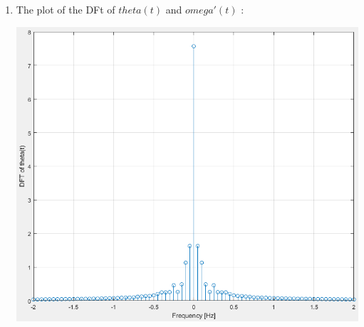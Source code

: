 \documentclass[a4paper,12pt]{article}
\begin{document}
\begin{enumerate}[label={\color{blue}\arabic*)}]
\begin{multicols}{2}
    \end{multicols}
    To get the plots :
    \begin{lstlisting}[style=Matlab-editor,language=Matlab, basicstyle=\small\ttfamily]
t_ang=0:Te2:Te(end)-Te2;

figure(6)
plot(t_ang, theta)
xlabel('Time [sec]')
ylabel('Angular position [rad]')
grid on

figure(7)
plot(Te,wd)
xlabel('Time [sec]')
ylabel('Angular acceleration [rad/s^2]')
grid on
        \end{lstlisting}
    

    \item
    The plot of the DFt of \(theta(t)\) and \(omega'(t)\) :
    \begin{multicols}{2}
    \begin{flushleft}
            \includegraphics[width=1\linewidth]{Images/DFT_theta.png}
            \label{Figure10}
        \end{flushleft}
    \columnbreak
    \begin{flushright}

\end{flushright}
\end{multicols}
\end{enumerate}
\end{document}
